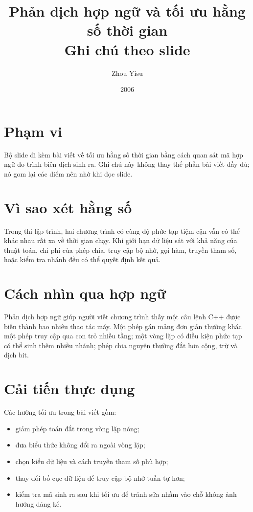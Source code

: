 \documentclass[11pt]{article}
\title{Phản dịch hợp ngữ và tối ưu hằng số thời gian\\{\large Ghi chú theo slide}}
\author{Zhou Yisu}
\date{2006}
\begin{document}
\maketitle


\section{Phạm vi}

Bộ slide đi kèm bài viết về tối ưu hằng số thời gian bằng cách quan sát mã
hợp ngữ do trình biên dịch sinh ra. Ghi chú này không thay thế phần bài viết
đầy đủ; nó gom lại các điểm nên nhớ khi đọc slide.

\section{Vì sao xét hằng số}

Trong thi lập trình, hai chương trình có cùng độ phức tạp tiệm cận vẫn có thể
khác nhau rất xa về thời gian chạy. Khi giới hạn dữ liệu sát với khả năng của
thuật toán, chi phí của phép chia, truy cập bộ nhớ, gọi hàm, truyền tham số,
hoặc kiểm tra nhánh đều có thể quyết định kết quả.

\section{Cách nhìn qua hợp ngữ}

Phản dịch hợp ngữ giúp người viết chương trình thấy một câu lệnh C++ được
biến thành bao nhiêu thao tác máy. Một phép gán mảng đơn giản thường khác một
phép truy cập qua con trỏ nhiều tầng; một vòng lặp có điều kiện phức tạp có
thể sinh thêm nhiều nhánh; phép chia nguyên thường đắt hơn cộng, trừ và dịch
bit.

\section{Cải tiến thực dụng}

Các hướng tối ưu trong bài viết gồm:
\begin{itemize}
  \item giảm phép toán đắt trong vòng lặp nóng;
  \item đưa biểu thức không đổi ra ngoài vòng lặp;
  \item chọn kiểu dữ liệu và cách truyền tham số phù hợp;
  \item thay đổi bố cục dữ liệu để truy cập bộ nhớ tuần tự hơn;
  \item kiểm tra mã sinh ra sau khi tối ưu để tránh sửa nhầm vào chỗ không
  ảnh hưởng đáng kể.
\end{itemize}
\end{document}
